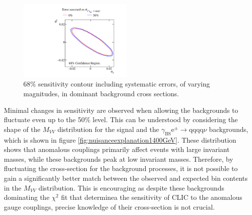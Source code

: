\begin{figure}[h!]
\centering
\includegraphics[width=0.5\textwidth]{PhysicsAnalysis/Plots/NuisanceFit/1400GeV/Nuisance.pdf}
\caption[68\% sensitivity contour including systematic errors, of varying magnitudes, in dominant background cross sections.]{68\% sensitivity contour including systematic errors, of varying magnitudes, in dominant background cross sections.}
\label{fig:nuisance1400GeV}
\end{figure}

Minimal changes in sensitivity are observed when allowing the backgrounds to fluctuate even up to the 50\% level.  This can be understood by considering the shape of the $M_{VV}$ distribution for the signal and the $\gamma_{\text{BS}}\text{e}^{\pm} \rightarrow \text{qqqq}\nu$ backgrounds, which is shown in figure \ref{fig:nuisanceexplanation1400GeV}.  These distribution shows that anomalous couplings primarily affect events with large invariant masses, while these backgrounds peak at low invariant masses.  Therefore, by fluctuating the cross-section for the background processes, it is not possible to gain a significantly better match between the observed and expected bin contents in the $M_{VV}$ distribution.  This is encouraging as despite these backgrounds dominating the $\chi^{2}$ fit that determinea the sensitivity of CLIC to the anomalous gauge couplings, precise knowledge of their cross-section is not crucial.

